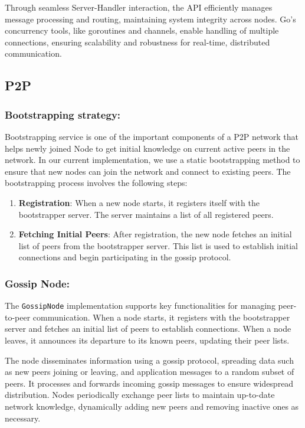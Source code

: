 Through seamless Server-Handler interaction, the API efficiently manages message processing and routing, maintaining system integrity across nodes. Go's concurrency tools, like goroutines and channels, enable handling of multiple connections, ensuring scalability and robustness for real-time, distributed communication.

\subsection{P2P}

\subsubsection{Bootstrapping strategy:}

Bootstrapping service is one of the important components of a P2P network that helps newly joined Node to get initial knowledge on current active peers in the network. 
In our current implementation, we use a static bootstrapping method to ensure that new nodes can join the network and connect to existing peers. The bootstrapping process involves the following steps:

\begin{enumerate}
    \item \textbf{Registration}: When a new node starts, it registers itself with the bootstrapper server. The server maintains a list of all registered peers.
    \item \textbf{Fetching Initial Peers}: After registration, the new node fetches an initial list of peers from the bootstrapper server. This list is used to establish initial connections and begin participating in the gossip protocol.
\end{enumerate}


\subsubsection{Gossip Node:}

The \texttt{GossipNode} implementation supports key functionalities for managing peer-to-peer communication. When a node starts, it registers with the bootstrapper server and fetches an initial list of peers to establish connections. When a node leaves, it announces its departure to its known peers, updating their peer lists.

The node disseminates information using a gossip protocol, spreading data such as new peers joining or leaving, and application messages to a random subset of peers. It processes and forwards incoming gossip messages to ensure widespread distribution. Nodes periodically exchange peer lists to maintain up-to-date network knowledge, dynamically adding new peers and removing inactive ones as necessary. 

